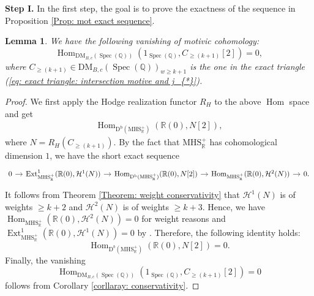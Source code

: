 \documentclass[11pt, a4paper]{amsart}
\theoremstyle{plain}
\newtheorem{lemma}[theorem]{Lemma}
\theoremstyle{definition}
\numberwithin{equation}{section}
\def\QQ{\mathbb{Q}}
\def\RR{\mathbb{R}}
\DeclareMathOperator{\Hom}{Hom}
\DeclareMathOperator{\Ext}{Ext}
\DeclareMathOperator{\Spec}{Spec}
\begin{document}
\noindent \textbf{Step I.} In the first step, the goal is to prove the exactness of the sequence in Proposition \ref{Prop: mot exact sequence}.

\begin{lemma}
\label{Lemma: mot vanshing}
We have the following vanishing of motivic cohomology: 
\begin{equation*}
   \Hom_{\mathrm{DM}_{B, c}(\Spec(\QQ))}(1_{\Spec(\QQ)}, C_{\ge(k + 1)}[2]) = 0, 
\end{equation*}
where $C_{\ge (k + 1)} \in \mathrm{DM}_{B, c}(\Spec(\QQ))_{w \ge k + 1}$ is the one in the exact triangle (\ref{eq: exact triangle: intersection motive and j_{*}}). 
    
\end{lemma}

\begin{proof}
    We first apply the Hodge realization functor $R_{H}$ to the above $\Hom$ space and get 
    \begin{align*}
        \Hom_{\mathrm{D^{b}}(\mathrm{MHS}_{\RR}^{+})}(\RR(0), N[2]), 
    \end{align*} 
    where $N = R_{H}(C_{\ge(k + 1)})$. 
    By the fact that $\mathrm{MHS}_{\RR}^{+}$ has cohomological dimension $1$,  we have the short exact sequence 
    \begin{equation*}
        \begin{tikzcd}[column sep = 1em]
            0 \ar[r] &  \Ext_{\mathrm{MHS}_{\RR}^{+}}^{1}(\RR(0), \mathcal{H}^{1}(N)) \ar[r] & \Hom_{\mathrm{D^{b}}(\mathrm{MHS}_{\RR}^{+})}(\RR(0), N[2]) \ar[r] & \Hom_{\mathrm{MHS}_{\RR}^{+}}(\RR(0), \mathcal{H}^{2}(N)) \ar[r] & 0. 
        \end{tikzcd}
    \end{equation*}
    It follows from Theorem \ref{Theorem: weight conservativity} that $\mathcal{H}^{1}(N)$ is of weights $\ge k + 2$ and $\mathcal{H}^{2}(N)$ is of weights $\ge k + 3$. Hence, we have $\Hom_{\mathrm{MHS}_{\RR}^{+}}(\RR(0), \mathcal{H}^{2}(N)) = 0$ for weight reasons and $\Ext_{\mathrm{MHS}_{\RR}^{+}}^{1}(\RR(0), \mathcal{H}^{1}(N)) = 0$ by \cite[Theorem A.2.10]{HW98}. Therefore, the following identity holds: 
    \begin{equation*}
        \Hom_{\mathrm{D}^{b}(\mathrm{MHS}_{\RR}^{+})}(\RR(0), N[2]) = 0.
    \end{equation*}
    Finally, the vanishing 
    \begin{equation*}
         \Hom_{\mathrm{DM}_{B, c}(\Spec(\QQ))}(1_{\Spec(\QQ)}, C_{\ge(k + 1)}[2]) = 0
    \end{equation*}
    follows from Corollary \ref{corllaray: conservativity}. 
\end{proof}
\end{document}

